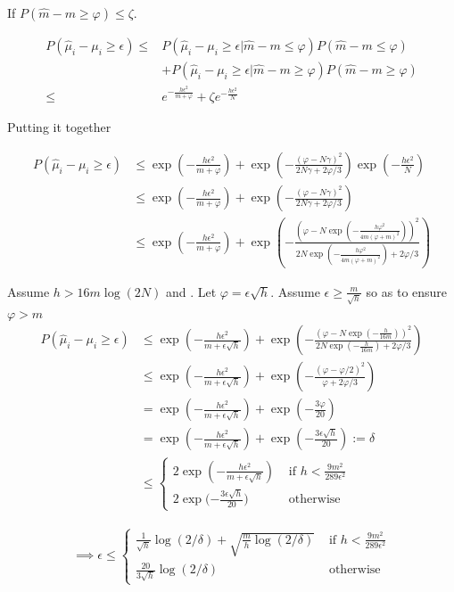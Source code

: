 \documentclass{article}
\newcommand{\eqn}[1]{\begin{align}#1\end{align}}
\theoremstyle{plain}
\theoremstyle{definition}
\begin{document}
If $P(\hat{m}-m \geq \varphi) \leq \zeta$. 


\eqn{
P(\hat{\mu}_i-\mu_i \geq \epsilon) \leq & P(\hat{\mu}_i-\mu_i \geq \epsilon |\hat{m}-m \leq \varphi )P(\hat{m}-m \leq \varphi) \\
& + P(\hat{\mu}_i-\mu_i \geq \epsilon |\hat{m}-m \geq \varphi)P(\hat{m}-m \geq \varphi)\\  \leq & e^{-\frac{h\epsilon^2}{m+\varphi}} + \zeta e^{-\frac{h \epsilon^2}{N}}
}

Putting it together 

\eqn {
P(\hat{\mu}_i-\mu_i \geq \epsilon)& \leq \exp({-\frac{h\epsilon^2}{m+\varphi}}) + \exp({-\frac{(\varphi-N\gamma)^2}{2N\gamma + 2\varphi/3}}) \exp({-\frac{h \epsilon^2}{N}})\\
& \leq \exp({-\frac{h\epsilon^2}{m+\varphi}}) + \exp({-\frac{(\varphi-N\gamma)^2}{2N\gamma + 2\varphi/3}}) \\
& \leq \exp({-\frac{h\epsilon^2}{m+\varphi}}) + \exp({-\frac{(\varphi-N\exp(-\frac{h\varphi^2}{4m(\varphi+m)^2}))^2}{2N\exp(-\frac{h\varphi^2}{4m(\varphi+m)^2}) + 2\varphi/3}})
}

Assume $h > 16m\log(2N)$ and . Let $\varphi = \epsilon\sqrt{h}$. Assume $\epsilon \geq \frac{m}{\sqrt{h}}$ so as to ensure $\varphi > m$
\eqn{
P(\hat{\mu}_i-\mu_i \geq \epsilon)& \leq \exp({-\frac{h\epsilon^2}{m+\epsilon\sqrt{h}}}) + \exp({-\frac{(\varphi-N\exp(-\frac{h}{16m}))^2}{2N\exp(-\frac{h}{16m}) + 2\varphi/3}})\\
& \leq \exp({-\frac{h\epsilon^2}{m+\epsilon\sqrt{h}}}) + \exp({-\frac{(\varphi-\varphi/2)^2}{\varphi + 2\varphi/3}})\\
& = \exp({-\frac{h\epsilon^2}{m+\epsilon\sqrt{h}}}) + \exp({-\frac{3\varphi}{20}})\\
& = \exp({-\frac{h\epsilon^2}{m+\epsilon\sqrt{h}}}) + \exp({-\frac{3\epsilon \sqrt{h}}{20}}) := \delta\\
& \leq \begin{cases}
2 \exp({-\frac{h\epsilon^2}{m+\epsilon\sqrt{h}}}) & \text{ if } h < \frac{9m^2}{289\epsilon^2} \\
2\exp({-\frac{3\epsilon\sqrt{h}}{20})} & \text{ otherwise } 
\end{cases}
}

\eqn{
\implies \epsilon \leq \begin{cases}
\frac{1}{\sqrt{h}}\log(2/\delta) + \sqrt{\frac{m}{h}\log(2/\delta)} & \text{ if } h < \frac{9m^2}{289\epsilon^2}\\
\frac{20}{3\sqrt{h}}\log(2/\delta) & \text{ otherwise }
\end{cases}\\
}
\end{document}

